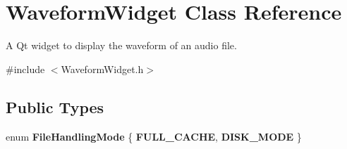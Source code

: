 \hypertarget{classWaveformWidget}{
\section{WaveformWidget Class Reference}
\label{classWaveformWidget}
}


A Qt widget to display the waveform of an audio file.  


{\ttfamily \#include $<$WaveformWidget.h$>$}\subsection*{Public Types}
\begin{DoxyCompactItemize}
\item 
enum {\bfseries FileHandlingMode} \{ {\bfseries FULL\_\-CACHE}, 
{\bfseries DISK\_\-MODE}
 \}
\end{DoxyCompactItemize}
